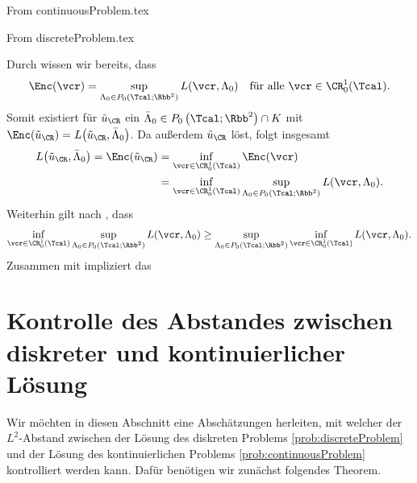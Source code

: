 From continuousProblem.tex


From discreteProblem.tex

  Durch  wissen wir bereits,
  dass 
  \begin{align*}
    \Enc(\vcr) = \sup_{\Lambda_0\in
    P_0\left(\Tcal;\Rbb^2\right)}L(\vcr,\Lambda_0)\quad\text{für alle }
    \vcr\in\CR^1_0(\Tcal).
  \end{align*}
  Somit existiert für $\tilde{u}_\CR$ ein $\bar\Lambda_0\in
  P_0\left(\Tcal;\Rbb^2\right)\cap K$ mit $\Enc\!\left(\tilde{u}_\CR\right) =
  L\!\left(\tilde{u}_\CR,\bar\Lambda_0\right)$. 
  Da außerdem $\tilde{u}_\CR$  löst, folgt insgesamt
  \begin{equation}
    \label{eq:lagrangianEqualsInfSup}
    \begin{aligned}
      L\!\left(\tilde{u}_\CR,\bar\Lambda_0\right)
      =
      \Enc\!\left(\tilde{u}_\CR\right)
      &=
      \inf_{\vcr\in\CR^1_0(\Tcal)}\Enc(\vcr)\\
      &=
      \inf_{\vcr\in\CR^1_0(\Tcal)}
      \sup_{\Lambda_0\in P_0\left(\Tcal;\Rbb^2\right)} L(\vcr,\Lambda_0).
    \end{aligned}
  \end{equation}
  Weiterhin gilt nach \cite[S. 379, Lemma 36.1]{Roc70}, dass
  \begin{align*}
    \inf_{\vcr\in\CR^1_0(\Tcal)}\sup_{\Lambda_0\in P_0\left(\Tcal;\Rbb^2\right)} 
    L(\vcr,\Lambda_0)
    \geq 
    \sup_{\Lambda_0\in P_0\left(\Tcal;\Rbb^2\right)} \inf_{\vcr\in\CR^1_0(\Tcal)} 
    L(\vcr,\Lambda_0).
  \end{align*}
  Zusammen mit  impliziert das
\section{Kontrolle des Abstandes zwischen diskreter und kontinuierlicher
Lösung}
Wir möchten in diesen Abschnitt eine Abschätzungen herleiten, mit welcher
der $L^2$-Abstand zwischen der Lösung des diskreten Problems
\ref{prob:discreteProblem} und der Lösung des kontinuierlichen Problems
\ref{prob:continuousProblem} kontrolliert werden kann.
Dafür benötigen wir zunächst folgendes Theorem.

